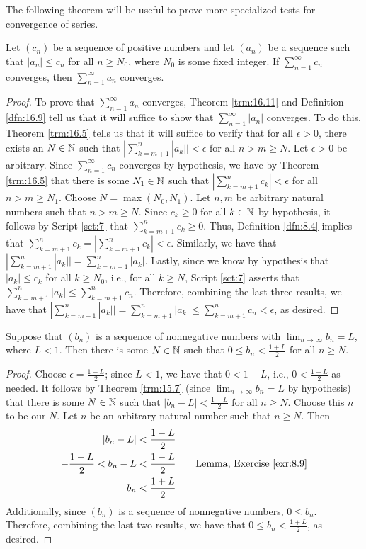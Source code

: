 \documentclass[../main.tex]{subfiles}
\begin{document}
The following theorem will be useful to prove more specialized tests for convergence of series.

\begin{theorem}\label{trm:16.13}
    Let $(c_n)$ be a sequence of positive numbers and let $(a_n)$ be a sequence such that $|a_n|\leq c_n$ for all $n\geq N_0$, where $N_0$ is some fixed integer. If $\sum_{n=1}^\infty c_n$ converges, then $\sum_{n=1}^\infty a_n$ converges.
    \begin{proof}
        To prove that $\sum_{n=1}^\infty a_n$ converges, Theorem \ref{trm:16.11} and Definition \ref{dfn:16.9} tell us that it will suffice to show that $\sum_{n=1}^\infty|a_n|$ converges. To do this, Theorem \ref{trm:16.5} tells us that it will suffice to verify that for all $\epsilon>0$, there exists an $N\in\mathbb{N}$ such that $|\sum_{k=m+1}^n|a_k||<\epsilon$ for all $n>m\geq N$. Let $\epsilon>0$ be arbitrary. Since $\sum_{n=1}^\infty c_n$ converges by hypothesis, we have by Theorem \ref{trm:16.5} that there is some $N_1\in\mathbb{N}$ such that $|\sum_{k=m+1}^nc_k|<\epsilon$ for all $n>m\geq N_1$. Choose $N=\max(N_0,N_1)$. Let $n,m$ be arbitrary natural numbers such that $n>m\geq N$. Since $c_k\geq 0$ for all $k\in\mathbb{N}$ by hypothesis, it follows by Script \ref{sct:7} that $\sum_{k=m+1}^nc_k\geq 0$. Thus, Definition \ref{dfn:8.4} implies that $\sum_{k=m+1}^nc_k=|\sum_{k=m+1}^nc_k|<\epsilon$. Similarly, we have that $|\sum_{k=m+1}^n|a_k||=\sum_{k=m+1}^n|a_k|$. Lastly, since we know by hypothesis that $|a_k|\leq c_k$ for all $k\geq N_0$, i.e., for all $k\geq N$, Script \ref{sct:7} asserts that $\sum_{k=m+1}^n|a_k|\leq\sum_{k=m+1}^nc_n$. Therefore, combining the last three results, we have that $|\sum_{k=m+1}^n|a_k||=\sum_{k=m+1}^n|a_k|\leq\sum_{k=m+1}^nc_n<\epsilon$, as desired.
    \end{proof}
\end{theorem}

\begin{lemma}\label{lem:16.14}
    Suppose that $(b_n)$ is a sequence of nonnegative numbers with $\lim_{n\to\infty}b_n=L$, where $L<1$. Then there is some $N\in\mathbb{N}$ such that $0\leq b_n<\frac{1+L}{2}$ for all $n\geq N$.
    \begin{proof}
        Choose $\epsilon=\frac{1-L}{2}$; since $L<1$, we have that $0<1-L$, i.e., $0<\frac{1-L}{2}$ as needed. It follows by Theorem \ref{trm:15.7} (since $\lim_{n\to\infty}b_n=L$ by hypothesis) that there is some $N\in\mathbb{N}$ such that $|b_n-L|<\frac{1-L}{2}$ for all $n\geq N$. Choose this $n$ to be our $N$. Let $n$ be an arbitrary natural number such that $n\geq N$. Then 
        \begin{align*}
            |b_n-L| &< \frac{1-L}{2}\\
            -\frac{1-L}{2} < b_n-L &< \frac{1-L}{2}\tag*{Lemma, Exercise \ref{exr:8.9}}\\
            b_n &< \frac{1+L}{2}
        \end{align*}
        Additionally, since $(b_n)$ is a sequence of nonnegative numbers, $0\leq b_n$. Therefore, combining the last two results, we have that $0\leq b_n<\frac{1+L}{2}$, as desired.
    \end{proof}
\end{lemma}
\end{document}
